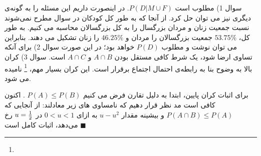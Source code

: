 \documentclass[10pt,letterpaper]{article}
\newcommand{\pf}{$\blacksquare$}
\begin{document}
سوال 1) 
مطلوب است 
$
P(D|M\cup F)
$.
 در اینصورت داریم
این مسئله را به گونه‌ی دیگری نیز می توان حل کرد. از آنجا که به طور کل کودکان در سوال مطرح نمی‌شوند نسبت جمعیت زنان و مردان بزرگسال را به کل بزرگسالان محاسبه می کنیم. به طور کل، 
$
53.75\%
$
 جمعیت بزرگسالان را مردان و
$
46.25\%
$
 را زنان تشکیل می دهند. بنابراین می توان نوشت
و مطلوب 
$
P(D)
$
 خواهد بود؛ در این صورت
\np
سوال 2)
برای آنکه تساوی ارضا شود، یک شرط کافی مستقل بودن $A\cap B$ و $A\cap C$ است.
\np
سوال 3) کران بالا به وضوح بنا به رابطه‌ی احتمال اجتماع برقرار است. این کران بسیار مهم، \textbf{}
\footnote{
}
 نامیده می شود.

برای اثبات کران پایین، ابتدا به دلیل تقارن فرض می کنیم 
$
P(A)\le P(B)
$
. اکنون کافی است مد نظر قرار دهیم که نامساوی های زیر معادلند:
از آنجایی که $
P(A\cap B)\le P(A)
$
 و بیشینه مقدار $u-u^2$ به ازای $0<u<1$ در $u={1\over 2}$ رخ می‌دهد، اثبات کامل است \pf
\end{document}
